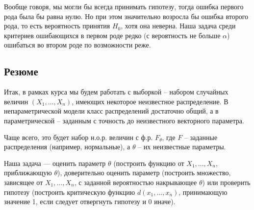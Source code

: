 \documentclass[10 pt,russian]{article}
\begin{document}
\begin{itemize}
Вообще говоря, мы могли бы всегда принимать гипотезу, тогда ошибка первого рода была бы равна нулю. Но при этом значительно возросла бы ошибка второго рода, то есть вероятность принятия $H_0$, хотя она неверна. Наша задача среди критериев ошибающихся в первом роде редко (с вероятность не больше $\alpha$) ошибаться во втором роде по возможности реже.
\end{itemize}
\subsection{Резюме}
Итак, в рамках курса мы будем работать с выборкой -- набором случайных величин $(X_1,\dotsc,X_n)$, имеющих некоторое неизвестное распределение. В непараметрической модели класс распределений достаточно общий, а в параметрической -- заданным с точность до неизвестного векторного параметра.

Чаще всего, это будет набор н.о.р. величин с ф.р. $F_{\theta}$, где $F$ -- заданные распределения (например, нормальные), а $\theta$ -- их неизвестные параметры.

Наша задача --- оценить параметр $\theta$ (построить функцию от $X_1,\dotsc, X_n$, приближающую $\theta$), доверительно оценить параметр (построить множество, зависящее от $X_1,\dotsc, X_n$, с заданной вероятностью накрывающее $\theta$) или проверить гипотезу (построить критическую функцию $d(x_1,\dotsc, x_n)$, принимающую значение 1, если следует отвергнуть гипотезу и 0 иначе).
\end{document}
